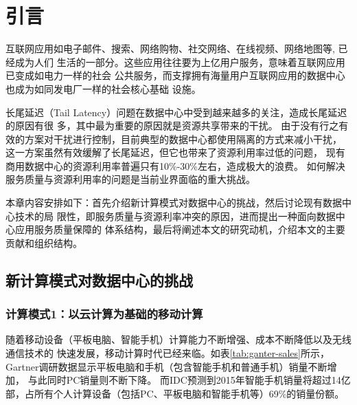 

\chapter{引言}
\label{chap:intro}

互联网应用如电子邮件、搜索、网络购物、社交网络、在线视频、网络地图等, 已经成为人们
生活的一部分。这些应用往往要为上亿用户服务，意味着互联网应用已变成如电力一样的社会
公共服务，而支撑拥有海量用户互联网应用的数据中心也成为如同发电厂一样的社会核心基础
设施。

长尾延迟（Tail Latency）问题在数据中心中受到越来越多的关注，造成长尾延迟的原因有很
多，其中最为重要的原因就是资源共享带来的干扰。
由于没有行之有效的方案对干扰进行控制，目前典型的数据中心都使用隔离的方式来减小干扰，
这一方案虽然有效缓解了长尾延迟，但它也带来了资源利用率过低的问题，
现有商用数据中心的资源利用率普遍只有10\%-30\%左右，造成极大的浪费。
如何解决服务质量与资源利用率的问题是当前业界面临的重大挑战。

本章内容安排如下：首先介绍新计算模式对数据中心的挑战，然后讨论现有数据中心技术的局
限性，即服务质量与资源利率冲突的原因，进而提出一种面向数据中心应用服务质量保障的
体系结构，最后将阐述本文的研究动机，介绍本文的主要贡献和组织结构。

%

\section{新计算模式对数据中心的挑战}

\subsection*{计算模式1：以云计算为基础的移动计算}

随着移动设备（平板电脑、智能手机）计算能力不断增强、成本不断降低以及无线通信技术的
快速发展，移动计算时代已经来临。如表\ref{tab:ganter-sales}所示，
Gartner调研数据显示平板电脑和手机（包含智能手机和普通手机）销量不断增加，
与此同时PC销量则不断下降。
而IDC预测到2015年智能手机销量将超过14亿部，占所有个人计算设备（包括PC、平板电脑和智能手机等）69\%的销量份额。

